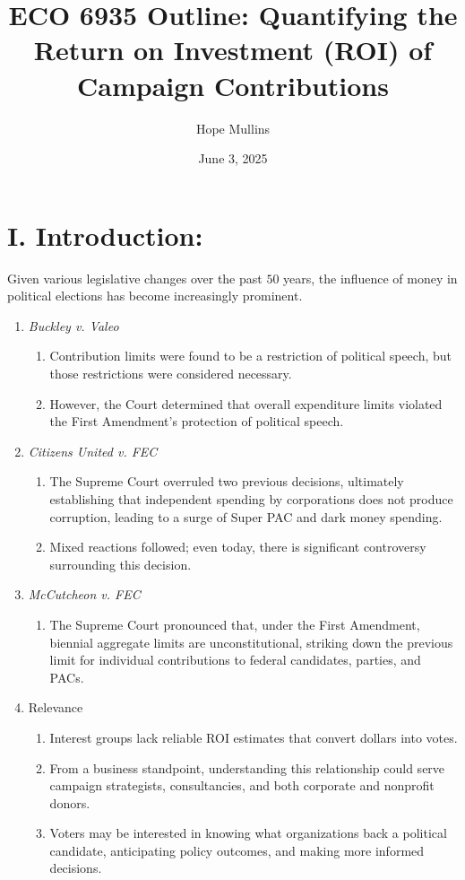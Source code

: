 \documentclass[12pt]{article}
\title{ECO 6935 Outline: Quantifying the Return on Investment (ROI) of Campaign Contributions}
\author{Hope Mullins}
\date{June 3, 2025}
\begin{document}
\maketitle

\doublespacing

\section*{I. Introduction:} Given various legislative changes over the past $50$ years, the influence of money in political elections has become increasingly prominent.
  \begin{enumerate}[label = \Alph*.]
    \item \textit{Buckley v. Valeo}
    \begin{enumerate}[label=\arabic*)]
        \item Contribution limits were found to be a restriction of political speech, but those restrictions were considered necessary.
        \item However, the Court determined that overall expenditure limits violated the First Amendment's protection of political speech.
    \end{enumerate}
    
    \item \textit{Citizens United v. FEC}
    \begin{enumerate}[label=\arabic*)]
        \item The Supreme Court overruled two previous decisions, ultimately establishing that independent spending by corporations does not produce corruption, leading to a surge of Super PAC and dark money spending.
        \item Mixed reactions followed; even today, there is significant controversy surrounding this decision. 
    \end{enumerate}
    
    \item \textit{McCutcheon v. FEC}
    \begin{enumerate}[label=\arabic*)]
        \item The Supreme Court pronounced that, under the First Amendment, biennial aggregate limits are unconstitutional, striking down the previous limit for individual contributions to federal candidates, parties, and PACs.
    \end{enumerate}
    
    \item Relevance
    \begin{enumerate}[label=\arabic*)]
        \item Interest groups lack reliable ROI estimates that convert dollars into votes.
        \item From a business standpoint, understanding this relationship could serve campaign strategists, consultancies, and both corporate and nonprofit donors.
        \item Voters may be interested in knowing what organizations back a political candidate, anticipating policy outcomes, and making more informed decisions.
    \end{enumerate}


\end{enumerate}
\end{document}
